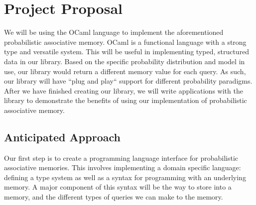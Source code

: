 \documentclass{sig-alternate}
\begin{document}



\section{Project Proposal}
\label{sec:project_proposal}
We will be using the OCaml language to implement the aforementioned probabilistic 
associative memory. OCaml is a functional language with a strong type and versatile
system. This will be useful in implementing typed, structured data in our library. 
Based on the specific probability distribution and model in use, our library would return 
a different memory value for each query. As such, our library will have ``plug and play`` support for 
different probability paradigms. After we have finished creating our library, we will 
write applications with the library to demonstrate the benefits of using our implementation
of probabilistic associative memory.


\subsection{Anticipated Approach}
\label{subsec:approach}

Our first step is to create a programming language interface for probabilistic
associative memories. This involves implementing a domain specific language: 
defining a type system as well as a syntax for programming with an underlying memory.
A major component of this syntax will be the way to store into a memory, 
and the different types of queries we can make to the memory.
\end{document}
